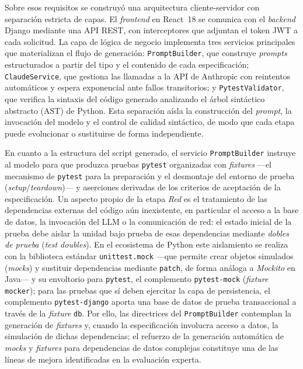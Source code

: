 \documentclass[10pt,journal,twoside,letterpaper]{IEEEtran}
\begin{document}
	Sobre esos requisitos se construyó una arquitectura cliente-servidor con separación estricta de capas. El \emph{frontend} en React~18 se comunica con el \emph{backend} Django mediante una API REST, con interceptores que adjuntan el token JWT a cada solicitud. La capa de lógica de negocio implementa tres servicios principales que materializan el flujo de generación: \texttt{PromptBuilder}, que construye \emph{prompts} estructurados a partir del tipo y el contenido de cada especificación; \texttt{ClaudeService}, que gestiona las llamadas a la API de Anthropic con reintentos automáticos y espera exponencial ante fallos transitorios; y \texttt{PytestValidator}, que verifica la sintaxis del código generado analizando el árbol sintáctico abstracto (AST) de Python. Esta separación aísla la construcción del \emph{prompt}, la invocación del modelo y el control de calidad sintáctico, de modo que cada etapa puede evolucionar o sustituirse de forma independiente.

	En cuanto a la estructura del script generado, el servicio \texttt{PromptBuilder} instruye al modelo para que produzca pruebas \texttt{pytest} organizadas con \emph{fixtures} ---el mecanismo de \texttt{pytest} para la preparación y el desmontaje del entorno de prueba (\emph{setup}/\emph{teardown})--- y aserciones derivadas de los criterios de aceptación de la especificación. Un aspecto propio de la etapa \emph{Red} es el tratamiento de las dependencias externas del código aún inexistente, en particular el acceso a la base de datos, la invocación del LLM o la comunicación de red: el estado inicial de la prueba debe aislar la unidad bajo prueba de esas dependencias mediante \emph{dobles de prueba} (\emph{test doubles}). En el ecosistema de Python este aislamiento se realiza con la biblioteca estándar \texttt{unittest.mock} ---que permite crear objetos simulados (\emph{mocks}) y sustituir dependencias mediante \texttt{patch}, de forma análoga a \emph{Mockito} en Java--- y su envoltorio para \texttt{pytest}, el complemento \texttt{pytest-mock} (\emph{fixture} \texttt{mocker}); para las pruebas que sí deben ejercitar la capa de persistencia, el complemento \texttt{pytest-django} aporta una base de datos de prueba transaccional a través de la \emph{fixture} \texttt{db}. Por ello, las directrices del \texttt{PromptBuilder} contemplan la generación de \emph{fixtures} y, cuando la especificación involucra acceso a datos, la simulación de dichas dependencias; el refuerzo de la generación automática de \emph{mocks} y \emph{fixtures} para dependencias de datos complejas constituye una de las líneas de mejora identificadas en la evaluación experta.
\end{document}
